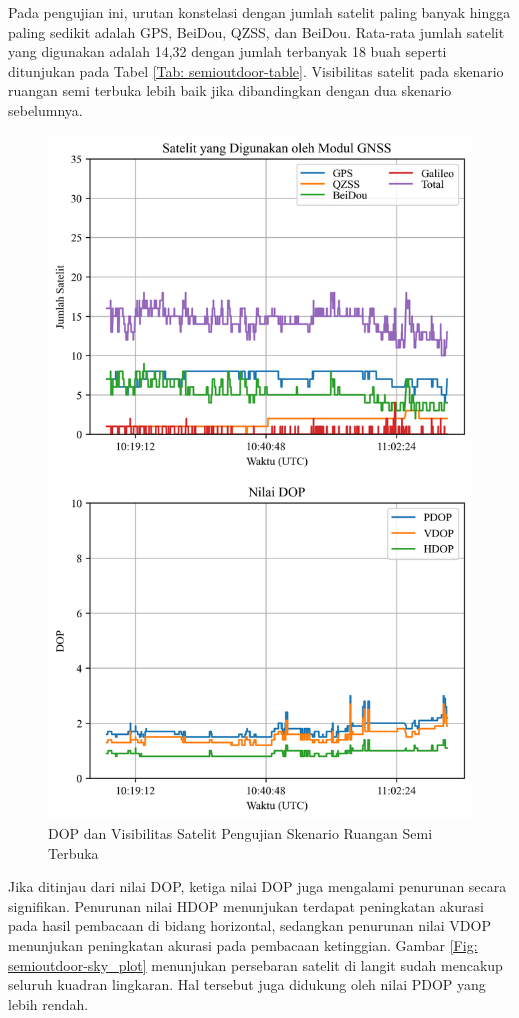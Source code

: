 Pada pengujian ini, urutan konstelasi dengan jumlah satelit paling banyak hingga paling sedikit adalah GPS, BeiDou, QZSS, dan BeiDou. Rata-rata jumlah satelit yang digunakan adalah 14,32 dengan jumlah terbanyak 18 buah seperti ditunjukan pada Tabel \ref{Tab: semioutdoor-table}. Visibilitas satelit pada skenario ruangan semi terbuka lebih baik jika dibandingkan dengan dua skenario sebelumnya.

\begin{figure}[H]
	\centering
	\captionsetup{justification=centering}
	\includegraphics[width=11.5cm]{contents/chapter-4/3-skenario-semioutdoor/sats_dop.png}
	\caption{DOP dan Visibilitas Satelit Pengujian Skenario Ruangan Semi Terbuka}
	\label{Fig: semioutdoor-sats_dop}
\end{figure}

Jika ditinjau dari nilai DOP, ketiga nilai DOP juga mengalami penurunan secara signifikan. Penurunan nilai HDOP menunjukan terdapat peningkatan akurasi pada hasil pembacaan di bidang horizontal, sedangkan penurunan nilai VDOP menunjukan peningkatan akurasi pada pembacaan ketinggian. Gambar \ref{Fig: semioutdoor-sky_plot} menunjukan persebaran satelit di langit sudah mencakup seluruh kuadran lingkaran. Hal tersebut juga didukung oleh nilai PDOP yang lebih rendah.

